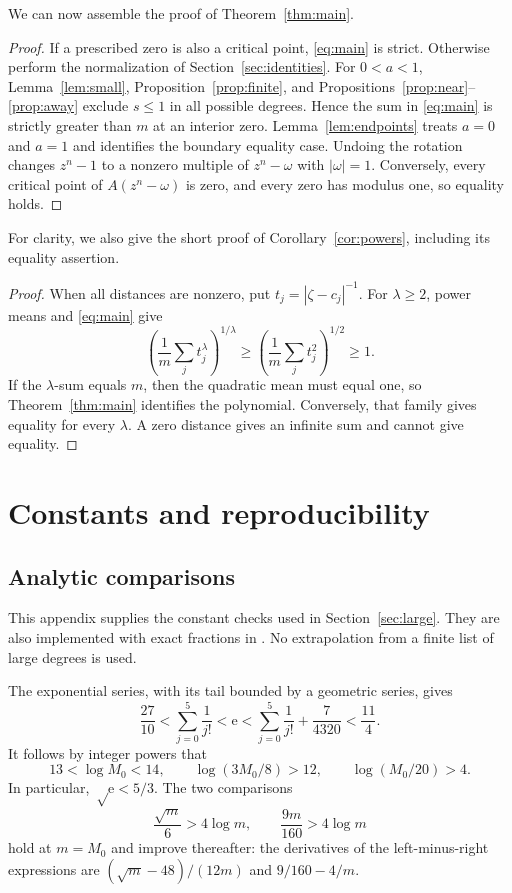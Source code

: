 \documentclass[11pt,letterpaper,reqno]{amsart}
\theoremstyle{definition}
\numberwithin{equation}{section}
\newcommand{\e}{\mathrm e}
\newcommand{\code}[1]{\texttt{\detokenize{#1}}}
\begin{document}
We can now assemble the proof of Theorem~\ref{thm:main}.

\begin{proof}
If a prescribed zero is also a critical point, \eqref{eq:main} is strict. Otherwise perform the normalization of Section~\ref{sec:identities}. For $0<a<1$, Lemma~\ref{lem:small}, Proposition~\ref{prop:finite}, and Propositions~\ref{prop:near}--\ref{prop:away} exclude $s\le1$ in all possible degrees. Hence the sum in \eqref{eq:main} is strictly greater than $m$ at an interior zero. Lemma~\ref{lem:endpoints} treats $a=0$ and $a=1$ and identifies the boundary equality case. Undoing the rotation changes $z^n-1$ to a nonzero multiple of $z^n-\omega$ with $|\omega|=1$. Conversely, every critical point of $A(z^n-\omega)$ is zero, and every zero has modulus one, so equality holds.
\end{proof}

For clarity, we also give the short proof of Corollary~\ref{cor:powers}, including its equality assertion.

\begin{proof}
When all distances are nonzero, put $t_j=|\zeta-c_j|^{-1}$. For $\lambda\ge2$, power means and \eqref{eq:main} give
\[
 \left(\frac1m\sum_jt_j^\lambda\right)^{1/\lambda}
 \ge\left(\frac1m\sum_jt_j^2\right)^{1/2}\ge1.
\]
If the $\lambda$-sum equals $m$, then the quadratic mean must equal one, so Theorem~\ref{thm:main} identifies the polynomial. Conversely, that family gives equality for every $\lambda$. A zero distance gives an infinite sum and cannot give equality.
\end{proof}

\appendix
\section{Constants and reproducibility}\label{app:audit}

\subsection{Analytic comparisons}\label{app:constants}
This appendix supplies the constant checks used in Section~\ref{sec:large}. They are also implemented with exact fractions in \code{analytic_audit.py}. No extrapolation from a finite list of large degrees is used.

The exponential series, with its tail bounded by a geometric series, gives
\[
 \frac{27}{10}<\sum_{j=0}^5\frac1{j!}<\e
 <\sum_{j=0}^5\frac1{j!}+\frac7{4320}<\frac{11}{4}.
\]
It follows by integer powers that
\[
 13<\log M_0<14,\qquad
 \log(3M_0/8)>12,\qquad \log(M_0/20)>4.
\]
In particular, $\sqrt\e<5/3$. The two comparisons
\[
 \frac{\sqrt m}{6}>4\log m,\qquad
 \frac{9m}{160}>4\log m
\]
hold at $m=M_0$ and improve thereafter: the derivatives of the left-minus-right expressions are $(\sqrt m-48)/(12m)$ and $9/160-4/m$.
\end{document}
